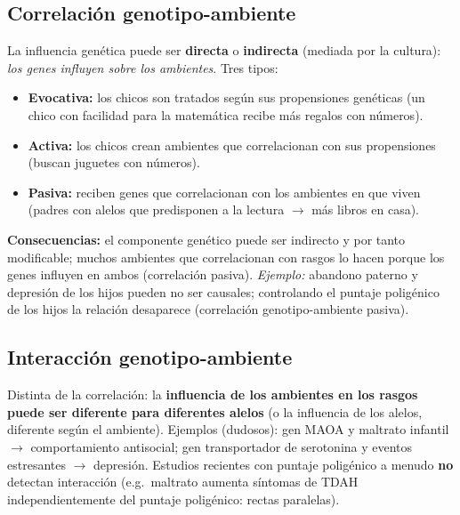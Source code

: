 \documentclass[11pt, a4paper]{article}
\begin{document}
\subsection{Correlaci\'on genotipo-ambiente}

La influencia gen\'etica puede ser \textbf{directa} o \textbf{indirecta} (mediada por la cultura): \emph{los genes influyen sobre los ambientes}. Tres tipos:
\begin{itemize}[nosep]
    \item \textbf{Evocativa:} los chicos son tratados seg\'un sus propensiones gen\'eticas (un chico con facilidad para la matem\'atica recibe m\'as regalos con n\'umeros).
    \item \textbf{Activa:} los chicos crean ambientes que correlacionan con sus propensiones (buscan juguetes con n\'umeros).
    \item \textbf{Pasiva:} reciben genes que correlacionan con los ambientes en que viven (padres con alelos que predisponen a la lectura $\to$ m\'as libros en casa).
\end{itemize}
\textbf{Consecuencias:} el componente gen\'etico puede ser indirecto y por tanto modificable; muchos ambientes que correlacionan con rasgos lo hacen porque los genes influyen en ambos (correlaci\'on pasiva). \emph{Ejemplo:} abandono paterno y depresi\'on de los hijos pueden no ser causales; controlando el puntaje poligénico de los hijos la relaci\'on desaparece (correlaci\'on genotipo-ambiente pasiva).

\subsection{Interacci\'on genotipo-ambiente}

Distinta de la correlaci\'on: la \textbf{influencia de los ambientes en los rasgos puede ser diferente para diferentes alelos} (o la influencia de los alelos, diferente seg\'un el ambiente). Ejemplos (dudosos): gen MAOA y maltrato infantil $\to$ comportamiento antisocial; gen transportador de serotonina y eventos estresantes $\to$ depresi\'on. Estudios recientes con puntaje poligénico a menudo \textbf{no} detectan interacci\'on (e.g.\ maltrato aumenta s\'intomas de TDAH independientemente del puntaje poligénico: rectas paralelas).
\end{document}
